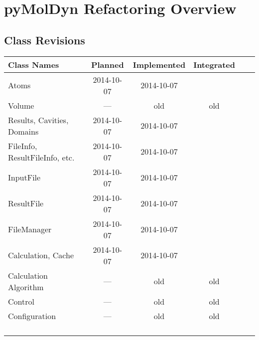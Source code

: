 \documentclass[final, oneside, a4paper, 11pt, pdftex, english]{scrreprt}
\begin{document}
\chapter*{pyMolDyn Refactoring Overview}
\section*{Class Revisions}

\begin{tabular}{|l|c|c|c|c|c|}
    \hline
    \textbf{Class Names} & \textbf{Planned} & \textbf{Implemented} & \textbf{Integrated} \\
    \hline
    Atoms & 2014-10-07 & 2014-10-07 & \\
    \hline
    Volume & --- & old & old \\
    \hline
    Results, Cavities, Domains & 2014-10-07 & 2014-10-07 & \\
    \hline
    FileInfo, ResultFileInfo, etc. & 2014-10-07 & 2014-10-07 & \\
    \hline
    InputFile & 2014-10-07 & 2014-10-07 & \\
    \hline
    ResultFile & 2014-10-07 & 2014-10-07 & \\
    \hline
    FileManager & 2014-10-07 & 2014-10-07 & \\
    \hline
    Calculation, Cache & 2014-10-07 & 2014-10-07 & \\
    \hline
    Calculation Algorithm & --- & old & old \\
    \hline
    Control & --- & old & old \\
    \hline
    Configuration & --- & old & old \\
    \hline
    & & & \\
    \hline
    & & & \\
    \hline
    & & & \\
    \hline
    & & & \\
    \hline
\end{tabular}
\end{document}
